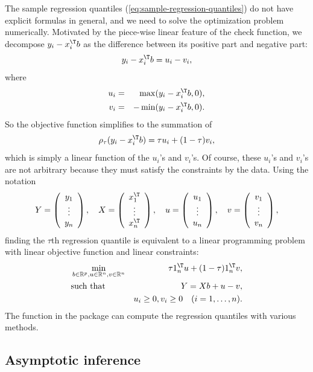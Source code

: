 The sample regression quantiles (\ref{eq:sample-regression-quantiles}) do
not have explicit formulas in general, and we need to solve the optimization
problem numerically. Motivated by the piece-wise linear feature of
the check function, we decompose $y_{i}-x_{i}^{\T} b $ as the
difference between its positive part and negative part:
\[
y_{i}-x_{i}^{\T} b =u_{i}-v_{i},
\]
where 
\begin{eqnarray*}
u_{i} &=& \max(y_{i}-x_{i}^{\T} b ,0),\\ 
v_{i} &=& -\min(y_{i}-x_{i}^{\T} b,0).
\end{eqnarray*}
So the objective function simplifies to the summation of 
\[
\rho_{\tau}(y_{i}-x_{i}^{\T} b)=\tau u_{i}+(1-\tau)v_{i},
\]
which is simply a linear function of the $u_{i}$'s and $v_{i}$'s.
Of course, these $u_{i}$'s and $v_{i}$'s are not arbitrary because
they must satisfy the constraints by the data. Using the notation
\[
Y=\left(\begin{array}{c}
y_{1}\\
\vdots\\
y_{n}
\end{array}\right),\quad X=\left(\begin{array}{c}
x_{1}^{\T}\\
\vdots\\
x_{n}^{\T}
\end{array}\right),\quad u=\left(\begin{array}{c}
u_{1}\\
\vdots\\
u_{n}
\end{array}\right),\quad v=\left(\begin{array}{c}
v_{1}\\
\vdots\\
v_{n}
\end{array}\right),
\]
finding the $\tau$th regression quantile is equivalent to a linear
programming problem with linear objective function and linear constraints:
\begin{eqnarray*}
 & \min_{b \in \mathbb{R}^p ,u \in  \mathbb{R}^n,v \in \mathbb{R}^n} &  \tau1_{n}^{\T}u+(1-\tau)1_{n}^{\T}v  ,\\
 & \text{such that}& Y=Xb+u-v,\\
 &&  u_i \geq  0, v_i \geq  0 \quad  (i=1,\ldots, n).
\end{eqnarray*}
The function  in the  package  can compute the regression quantiles with various methods. 

\subsection{Asymptotic inference}

